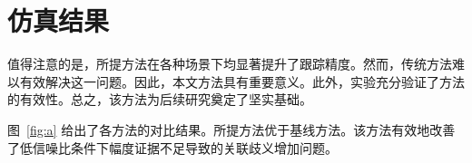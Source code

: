 \section{仿真结果}
值得注意的是，所提方法在各种场景下均显著提升了跟踪精度。然而，传统方法难以有效解决这一问题。因此，本文方法具有重要意义。此外，实验充分验证了方法的有效性。总之，该方法为后续研究奠定了坚实基础。

图~\ref{fig:a} 给出了各方法的对比结果。所提方法优于基线方法。该方法有效地改善了低信噪比条件下幅度证据不足导致的关联歧义增加问题。
